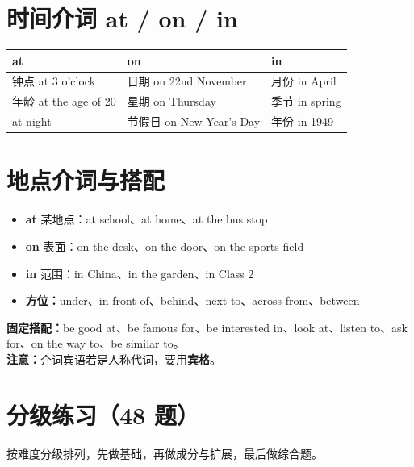 \documentclass[11pt,a4paper]{ctexart}
\begin{document}
\section{时间介词 at / on / in}
\begin{center}
\begin{tabular}{p{4.6cm}p{4.4cm}p{4.2cm}}
\hline
\textbf{at} & \textbf{on} & \textbf{in}\\
\hline
钟点 at 3 o'clock & 日期 on 22nd November & 月份 in April\\
年龄 at the age of 20 & 星期 on Thursday & 季节 in spring\\
at night & 节假日 on New Year's Day & 年份 in 1949\\
\hline
\end{tabular}
\end{center}

\section{地点介词与搭配}
\begin{itemize}[leftmargin=1.4em]
\item \textbf{at} 某地点：at school、at home、at the bus stop
\item \textbf{on} 表面：on the desk、on the door、on the sports field
\item \textbf{in} 范围：in China、in the garden、in Class 2
\item \textbf{方位：}under、in front of、behind、next to、across from、between
\end{itemize}
\textbf{固定搭配：}be good at、be famous for、be interested in、look at、listen to、ask for、on the way to、be similar to。\\
\textbf{注意：}介词宾语若是人称代词，要用\textbf{宾格}。


\newpage
\section{分级练习（48 题）}
\noindent 按难度分级排列，先做基础，再做成分与扩展，最后做综合题。
\end{document}

